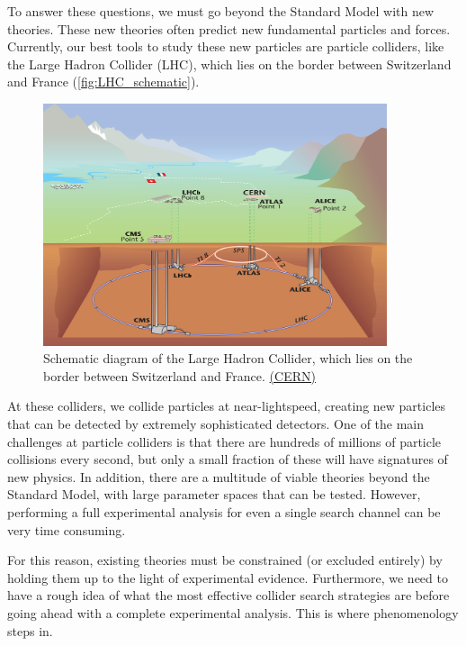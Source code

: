 To answer these questions, we must go beyond the Standard Model with new theories. These new theories often predict new fundamental particles and forces. Currently, our best tools to study these new particles are particle colliders, like the Large Hadron Collider (LHC), which lies on the border between Switzerland and France (\autoref{fig:LHC_schematic}).

\begin{figure}
  \centering
  \includegraphics[width=0.9\textwidth]{images/LHC}
  \caption{Schematic diagram of the Large Hadron Collider, which lies on the border between Switzerland and France. \href{http://cds.cern.ch/journal/CERNBulletin/2008/38/News\%20Articles/1125888?ln=en}{(CERN)}}
  \label{fig:LHC_schematic}
\end{figure}

At these colliders, we collide particles at near-lightspeed, creating new particles that can be detected by extremely sophisticated detectors. One of the main challenges at particle colliders is that there are hundreds of millions of particle collisions every second, but only a small fraction of these will have signatures of new physics. In addition, there are a multitude of viable theories beyond the Standard Model, with large parameter spaces that can be tested. However, performing a full experimental analysis for even a single search channel can be very time consuming.

For this reason, existing theories must be constrained (or excluded entirely) by holding them up to the light of experimental evidence. Furthermore, we need to have a rough idea of what the most effective collider search strategies are before going ahead with a complete experimental analysis. This is where phenomenology steps in.

